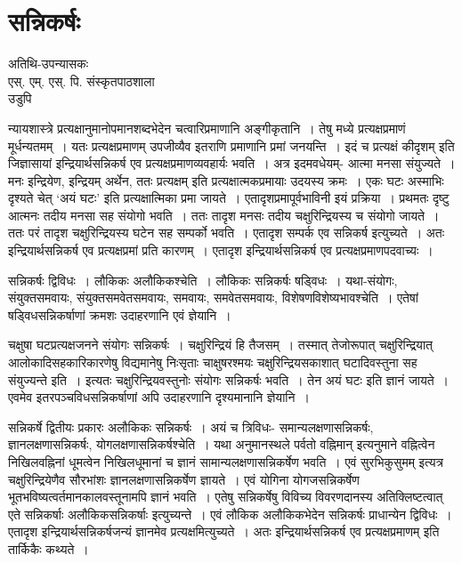 {\fontsize{15}{17}\selectfont
\presetvalues
\chapter{सन्निकर्षः}

\begin{center}
\smallskip
अतिथि-उपन्यासकः\\
एस्. एम्. एस्. पि. संस्कृतपाठशाला\\
उडुपि
\addrule
\end{center} 
न्यायशास्त्रे प्रत्यक्षानुमानोपमानशब्दभेदेन चत्वारिप्रमाणानि अङ्गीकृतानि~। तेषु मध्ये प्रत्यक्षप्रमाणं मूर्धन्यतमम्~। यतः प्रत्यक्षप्रमाणम् उपजीव्यैव इतराणि प्रमाणानि प्रमां जनयन्ति~। इदं च प्रत्यक्षं कीदृशम् इति जिज्ञासायां इन्द्रियार्थसन्निकर्ष एव प्रत्यक्षप्रमाणव्यवहार्यः भवति~। अत्र इदमवधेयम्- आत्मा मनसा संयुज्यते~। मनः इन्द्रियेण, इन्द्रियम् अर्थेन, ततः प्रत्यक्षम् इति प्रत्यक्षात्मकप्रमायाः उदयस्य क्रमः~। एकः घटः अस्माभिः दृश्यते चेत् ‘अयं घटः’ इति प्रत्यक्षात्मिका प्रमा जायते~। एतादृशप्रमापूर्वभाविनी इयं प्रक्रिया~। प्रथमतः दृष्टु आत्मनः तदीय मनसा सह संयोगो भवति~। ततः तादृश मनसः तदीय चक्षुरिन्द्रियस्य च संयोगो जायते~। ततः परं तादृश चक्षुरिन्द्रियस्य घटेन सह सम्पर्को भवति~। एतादृश सम्पर्क एव सन्निकर्ष इत्युच्यते~। अतः इन्द्रियार्थसन्निकर्ष एव प्रत्यक्षप्रमां प्रति कारणम्~। एतादृश इन्द्रियार्थसन्निकर्ष एव प्रत्यक्षप्रमाणपदवाच्यः~। 

सन्निकर्षः द्विविधः~। लौकिकः अलौकिकश्चेति~। लौकिकः सन्निकर्षः षड्विधः~। यथा-संयोगः, संयुक्तसमवायः, संयुक्तसमवेतसमवायः, समवायः, समवेतसमवायः, विशेषणविशेष्यभावश्चेति~। एतेषां षड्विधसन्निकर्षाणां क्रमशः उदाहरणानि एवं ज्ञेयानि~। 

चक्षुषा घटप्रत्यक्षजनने संयोगः सन्निकर्षः~। चक्षुरिन्द्रियं हि तैजसम्~। तस्मात् तेजोरूपात् चक्षुरिन्द्रियात् आलोकादिसहकारिकारणेषु विद्यमानेषु निःसृताः चाक्षुषरश्मयः चक्षुरिन्द्रियसकाशात् घटादिवस्तुना सह संयुज्यन्ते इति~। इत्यतः चक्षुरिन्द्रियवस्तुनोः संयोगः सन्निकर्षः भवति~। तेन अयं घटः इति ज्ञानं जायते~। एवमेव इतरपञ्चविधसन्निकर्षाणां अपि उदाहरणानि दृश्यमानानि ज्ञेयानि~।            

सन्निकर्षे द्वितीयः प्रकारः अलौकिकः सन्निकर्षः~। अयं च त्रिविधः- समान्यलक्षणासन्निकर्षः, ज्ञानलक्षणासन्निकर्षः, योगलक्षणासन्निकर्षश्चेति~। यथा अनुमानस्थले पर्वतो वह्निमान् इत्यनुमाने वह्नित्वेन निखिलवह्निनां धूमत्वेन निखिलधूमानां च ज्ञानं सामान्यलक्षणासन्निकर्षेण भवति~। एवं सुरभिकुसुमम् इत्यत्र चक्षुरिन्द्रियेणैव सौरभांशः ज्ञानलक्षणासन्निकर्षेण ज्ञायते~। एवं योगिना योगजसन्निकर्षेण भूतभविष्यत्वर्तमानकालवस्तूनामपि ज्ञानं भवति~। एतेषु सन्निकर्षेषु विविच्य विवरणदानस्य अतिक्लिष्टत्वात् एते सन्निकर्षाः अलौकिकसन्निकर्षाः इत्युच्यन्ते~। एवं लौकिक अलौकिकभेदेन सन्निकर्षः प्राधान्येन द्विविधः~। एतादृश इन्द्रियार्थसन्निकर्षजन्यं ज्ञानमेव प्रत्यक्षमित्युच्यते~। अतः  इन्द्रियार्थसन्निकर्ष एव प्रत्यक्षप्रमाणम् इति तार्किकैः कथ्यते~। 

\articleend
}
